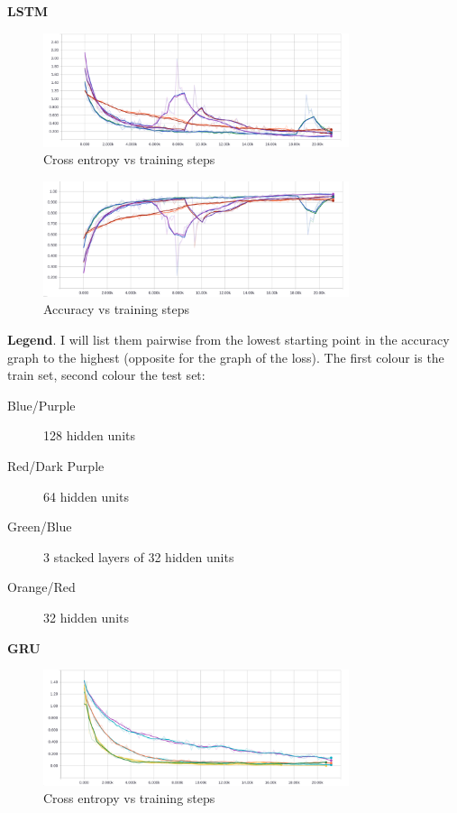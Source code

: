 \documentclass{article}
\begin{document}
\textbf{LSTM}

\begin{figure}[H]
  \centering
  \includegraphics[width=0.8\textwidth]{task1/LSTM_task1_loss.png}
  \caption{Cross entropy vs training steps}
  \label{fig:LSTM_Xent_1}
\end{figure}

\begin{figure}[H]
  \centering
  \includegraphics[width=0.8\textwidth]{task1/LSTM_task1_acc.png}
  \caption{Accuracy vs training steps}
  \label{fig:LSTM_acc_1}
\end{figure}

\textbf{Legend}. I will list them pairwise from the lowest starting point in the accuracy
graph to the highest (opposite for the graph of the loss). The first colour is the train set, second colour the test set:

\begin{description}
\item[Blue/Purple] 128 hidden units
\item[Red/Dark Purple] 64 hidden units
\item[Green/Blue] 3 stacked layers of 32 hidden units
\item[Orange/Red] 32 hidden units
\end{description}

\textbf{GRU}

\begin{figure}[H]
  \centering
  \includegraphics[width=0.8\textwidth]{task1/GRU_task1_loss.png}
  \caption{Cross entropy vs training steps}
  \label{fig:GRU_Xent_1}
\end{figure}
\end{document}
